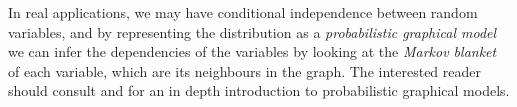 In real applications, we may have conditional independence between random variables, and by representing the distribution as a \emph{probabilistic graphical model} we can infer the dependencies of the variables by looking at the \emph{Markov blanket} of each variable, which are its neighbours in the graph. The interested reader should consult  \citet[Ch. 8]{Bishop2006} and \citet{Petrucelli1974} for an in depth introduction to probabilistic graphical models.
